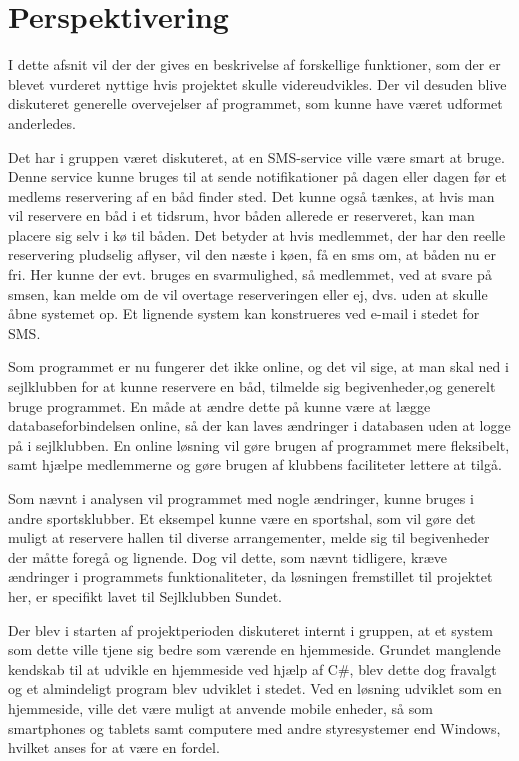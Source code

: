 \chapter{Perspektivering}

I dette afsnit vil der der gives en beskrivelse af forskellige funktioner, som der er blevet vurderet nyttige hvis projektet skulle videreudvikles. 
Der vil desuden blive diskuteret generelle overvejelser af programmet, som kunne have været udformet anderledes. 

Det har i gruppen været diskuteret, at en SMS-service ville være smart at bruge. 
Denne service kunne bruges til at sende notifikationer på dagen eller dagen før et medlems reservering af en båd finder sted. 
Det kunne også tænkes, at hvis man vil reservere en båd i et tidsrum, hvor båden allerede er reserveret, kan man placere sig selv i kø til båden.
Det betyder at hvis medlemmet, der har den reelle reservering pludselig aflyser, vil den næste i køen, få en sms om, at båden nu er fri.
Her kunne der evt. bruges en svarmulighed, så medlemmet, ved at svare på smsen, kan melde om de vil overtage reserveringen eller ej, dvs. uden at skulle åbne systemet op. 
Et lignende system kan konstrueres ved e-mail i stedet for SMS.

Som programmet er nu fungerer det ikke online, og det vil sige, at man skal ned i sejlklubben for at kunne reservere en båd, tilmelde sig begivenheder,og generelt bruge programmet. 
En måde at ændre dette på kunne være at lægge databaseforbindelsen online, så der kan laves ændringer i databasen uden at logge på i sejlklubben. 
En online løsning vil gøre brugen af programmet mere fleksibelt, samt hjælpe medlemmerne og gøre brugen af klubbens faciliteter lettere at tilgå.

Som nævnt i analysen vil programmet med nogle ændringer, kunne bruges i andre sportsklubber. 
Et eksempel kunne være en sportshal, som vil gøre det muligt at reservere hallen til diverse arrangementer, melde sig til begivenheder der måtte foregå og lignende. 
Dog vil dette, som nævnt tidligere, kræve ændringer i programmets funktionaliteter, da løsningen fremstillet til projektet her, er specifikt lavet til Sejlklubben Sundet.

Der blev i starten af projektperioden diskuteret internt i gruppen, at et system som dette ville tjene sig bedre som værende en hjemmeside.
Grundet manglende kendskab til at udvikle en hjemmeside ved hjælp af C\#, blev dette dog fravalgt og et almindeligt program blev udviklet i stedet. 
Ved en løsning udviklet som en hjemmeside, ville det være muligt at anvende mobile enheder, så som smartphones og tablets samt computere med andre styresystemer end Windows, hvilket anses for at være en fordel.
